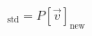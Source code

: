 \documentclass[preview]{standalone}
\begin{document}
\begin{align*}
[\vec{v}]_{\text{std}} = P [\vec{v}]_{\text{new}}
\end{align*}
\end{document}
